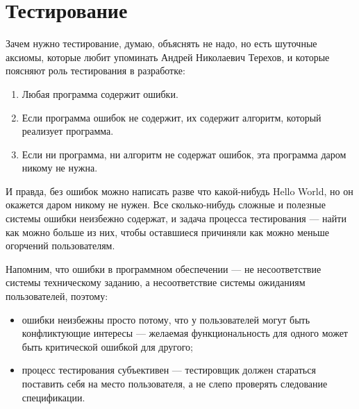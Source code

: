 \documentclass{../../text-style}
\begin{document}
\maketitle
\thispagestyle{empty}

\section{Тестирование}

Зачем нужно тестирование, думаю, объяснять не надо, но есть шуточные аксиомы, которые любит упоминать Андрей Николаевич Терехов, и которые поясняют роль тестирования в разработке:

\begin{enumerate}
    \item Любая программа содержит ошибки.
    \item Если программа ошибок не содержит, их содержит алгоритм, который реализует программа.
    \item Если ни программа, ни алгоритм не содержат ошибок, эта программа даром никому не нужна.
\end{enumerate}

И правда, без ошибок можно написать разве что какой-нибудь Hello World, но он окажется даром никому не нужен. Все сколько-нибудь сложные и полезные системы ошибки неизбежно содержат, и задача процесса тестирования --- найти как можно больше из них, чтобы оставшиеся причиняли как можно меньше огорчений пользователям.

Напомним, что ошибки в программном обеспечении --- не несоответствие системы техническому заданию, а несоответствие системы ожиданиям пользователей, поэтому:

\begin{itemize}
    \item ошибки неизбежны просто потому, что у пользователей могут быть конфликтующие интересы --- желаемая функциональность для одного может быть критической ошибкой для другого;
    \item процесс тестирования субъективен --- тестировщик должен стараться поставить себя на место пользователя, а не слепо проверять следование спецификации.
\end{itemize}
\end{document}
